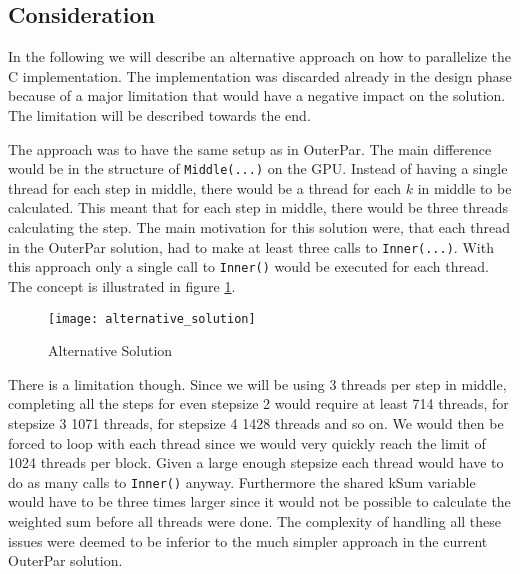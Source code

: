 \subsection{Consideration}
In the following we will describe an alternative approach on how to parallelize the C implementation. The implementation was discarded already in the design phase because of a major limitation that would have a negative impact on the solution. The limitation will be described towards the end.

The approach was to have the same setup as in OuterPar. The main difference would be in the structure of \texttt{Middle(...)} on the GPU. Instead of having a single thread for each step in middle, there would be a thread for each $k$ in middle to be calculated. This meant that for each step in middle, there would be three threads calculating the step. The main motivation for this solution were, that each thread in the OuterPar solution, had to make at least three calls to \texttt{Inner(...)}. With this approach only a single call to \texttt{Inner()} would be executed for each thread. The concept is illustrated in figure \ref{fig:alternative}.

\begin{figure}[ht!]
  \centering
    \texttt{[image: alternative\_solution]}
  \caption{Alternative Solution}
  \label{fig:alternative}
\end{figure}

There is a limitation though. Since we will be using 3 threads per step in middle, completing all the steps for even stepsize 2 would require at least 714 threads, for stepsize 3 1071 threads, for stepsize 4 1428 threads and so on. We would then be forced to loop with each thread since we would very quickly reach the limit of 1024 threads per block. Given a large enough stepsize each thread would have to do as many calls to \texttt{Inner()} anyway. Furthermore the shared kSum variable would have to be three times larger since it would not be possible to calculate the weighted sum before all threads were done. The complexity of handling all these issues were deemed to be inferior to the much simpler approach in the current OuterPar solution.


